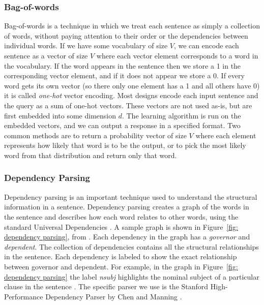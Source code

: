 \documentclass[pageno]{final_paper}
\begin{document}
\subsubsection{Bag-of-words}
\label{Bag-of-words}

Bag-of-words is a technique in which we treat each sentence as simply a
collection of words, without paying attention to their order or the dependencies
between individual words. If we have some vocabulary of size $V$, we can encode
each sentence as a vector of size $V$ where each vector element corresponds to a
word in the vocabulary. If the word appears in the sentence then we store a 1 in
the corresponding vector element, and if it does not appear we store a 0. If
every word gets its own vector (so there only one element has a 1 and all others
have 0) it is called \textit{one-hot} vector encoding. Most designs encode each
input sentence and the query as a sum of one-hot vectors. These vectors are not
used as-is, but are first embedded into some dimension $d$. The learning
algorithm is run on the embedded vectors, and we can output a response in a
specified format. Two common methods are to return a probability vector of size
$V$ where each element represents how likely that word is to be the output, or
to pick the most likely word from that distribution and return only that word.

\subsubsection{Dependency Parsing}
\label{Dependency Parsing}

Dependency parsing is an important technique used to understand the structural
information in a sentence. Dependency parsing creates a graph of the words in
the sentence and describes how each word relates to other words, using the
standard Universal Dependencies \cite{De2014}. A sample graph is shown in
Figure~\ref{fig: dependency parsing}, from \cite{Chen2014}. Each dependency in
the graph has a \textit{governor} and \textit{dependent}. The collection of
dependencies contains all the structural relationships in the sentence. Each
dependency is labeled to show the exact relationship between governor and
dependent. For example, in the graph in Figure~\ref{fig: dependency parsing} the
label \textit{nsubj} highlights the nominal subject of a particular clause in
the sentence \cite{De2014}. The specific parser we use is the Stanford
High-Performance Dependency Parser by Chen and Manning \cite{Chen2014}.
\end{document}
